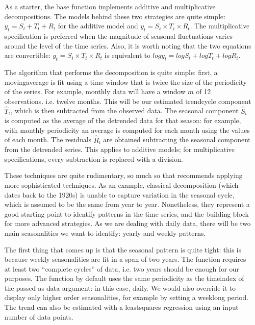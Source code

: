 \documentclass[letterpaper,10pt,english]{jupyterBook}
\begin{document}
\sphinxAtStartPar
As a starter, the base function  implements additive and multiplicative decompositions. The models behind these two strategies are quite simple: \(y_t = S_t + T_t + R_t\) for the additive model and \(y_t = S_t \times T_t \times R_t\). The multiplicative specification is preferred when the magnitude of seasonal fluctuations varies around the level of the time series. Also, it is worth noting that the two equations are convertible: \(y_t = S_t \times T_t \times R_t\) is equivalent to \(logy_t = logS_t + logT_t + logR_t\).

\sphinxAtStartPar
The algorithm that performs the decomposition is quite simple: first, a moving\sphinxhyphen{}average is fit using a time window that is twice the size of the periodicity of the series. For example, monthly data will have a window \(m\) of 12 observations. i.e. twelve months. This will be our estimated trend\sphinxhyphen{}cycle component \(\hat{T}_t\), which is then subtracted from the observed data. The seasonal component \(\hat{S}_t\) is computed as the average of the de\sphinxhyphen{}trended data for that season: for example, with monthly periodicity an average is computed for each month using the values of each month. The residuals \(\hat{R}_t\) are obtained subtracting the seasonal component from the de\sphinxhyphen{}trended series. This applies to additive models; for multiplicative specifications, every subtraction is replaced with a division.

\sphinxAtStartPar
These techniques are quite rudimentary, so much so that  recommends applying more sophisticated techniques. As an example, classical decomposition (which dates back to the 1920s) is unable to capture variation in the seasonal cycle, which is assumed to be the same from year to year. Nonetheless, they represent a good starting point to identify patterns in the time series, and the building block for more advanced strategies. As we are dealing with daily data, there will be two main seasonalities we want to identify: yearly and weekly patterns.

\sphinxAtStartPar
The first thing that comes up is that the seasonal pattern is quite tight: this is because weekly seasonalities are fit in a span of two years. The  function requires at least two “complete cycles” of data, i.e. two years should be enough for our purposes. The function by default uses the same periodicity as the time\sphinxhyphen{}index of the  passed as data argument: in this case, daily. We would also override it to display only higher order seasonalities, for example by setting a week\sphinxhyphen{}long period. The trend can also be estimated with a least\sphinxhyphen{}squares regression using an input number of data points.
\end{document}
